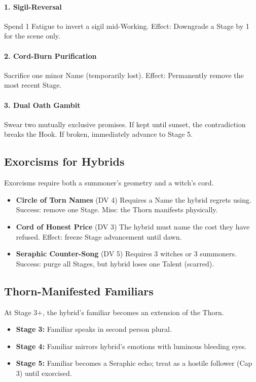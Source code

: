 \documentclass[11pt]{book}
\begin{document}
\paragraph{1. Sigil-Reversal}
Spend 1 Fatigue to invert a sigil mid-Working.  
Effect: Downgrade a Stage by 1 for the scene only.

\paragraph{2. Cord-Burn Purification}
Sacrifice one minor Name (temporarily lost).  
Effect: Permanently remove the most recent Stage.

\paragraph{3. Dual Oath Gambit}
Swear two mutually exclusive promises.  
If kept until sunset, the contradiction breaks the Hook.  
If broken, immediately advance to Stage 5.

\subsection*{Exorcisms for Hybrids}
Exorcisms require both a summoner's geometry and a witch's cord.

\begin{itemize}[leftmargin=1.5em]
    \item \textbf{Circle of Torn Names} (DV 4)  
    Requires a Name the hybrid regrets using.  
    Success: remove one Stage.  
    Miss: the Thorn manifests physically.

    \item \textbf{Cord of Honest Price} (DV 3)  
    The hybrid must name the cost they have refused.  
    Effect: freeze Stage advancement until dawn.

    \item \textbf{Seraphic Counter-Song} (DV 5)  
    Requires 3 witches or 3 summoners.  
    Success: purge all Stages, but hybrid loses one Talent (scarred).
\end{itemize}

\subsection*{Thorn-Manifested Familiars}
At Stage 3+, the hybrid's familiar becomes an extension of the Thorn.

\begin{itemize}
    \item \textbf{Stage 3:} Familiar speaks in second person plural.  
    \item \textbf{Stage 4:} Familiar mirrors hybrid's emotions with luminous bleeding eyes.  
    \item \textbf{Stage 5:} Familiar becomes a Seraphic echo; treat as a hostile follower (Cap 3) until exorcised.
\end{itemize}
\end{document}
